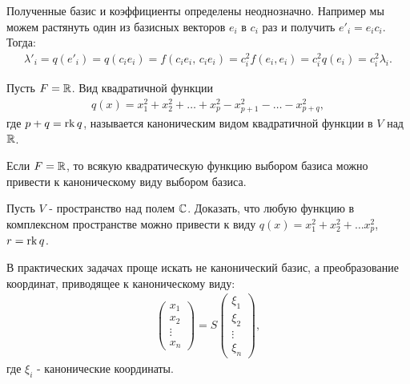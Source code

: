 \begin{note}
    Полученные базис и коэффициенты определены неоднозначно. Например мы можем растянуть один из 
    базисных векторов $e_i$ в $c_i$ раз и получить $e'_i = e_i c_i$. Тогда:
    \begin{gather*}
        \lambda'_i = q(e'_i) = q(c_i e_i) = f(c_i e_i,\, c_i e_i) = c_i^2 f(e_i, e_i) 
        = c_i^2 q(e_i) = c_i^2 \lambda_i.
    \end{gather*}
\end{note}

\begin{definition}
    Пусть $F = \mathbb{R}$. Вид квадратичной функции
    \begin{align*}
        q(x) = x_1^2 + x_2^2 + \dots + x_p^2 - x_{p+1}^2 - \dots - x_{p+q}^2,
    \end{align*} 
    где $p + q = \operatorname{rk} q$, называется каноническим видом квадратичной функции в $V$ над $\mathbb{R}$.
\end{definition}

\begin{corollary}
    Если $F = \mathbb{R}$, то всякую квадратическую функцию выбором базиса можно привести к каноническому виду 
    выбором базиса.
\end{corollary}

\begin{exercise}
    Пусть $V$ - пространство над полем $\mathbb{C}$. Доказать, что любую функцию в комплексном пространстве 
    можно привести к виду $q(x) = x_1^2 + x_2^2 + \dots x_p^2$, $r = \operatorname{rk} q$.
\end{exercise}

\begin{note}
    В практических задачах проще искать не канонический базис, а преобразование координат, приводящее 
    к каноническому виду: 
    \begin{gather*}
        \begin{pmatrix}
            x_1    \\
            x_2    \\
            \vdots \\
            x_n              
        \end{pmatrix} = S \begin{pmatrix}
            \xi_1      \\
            \xi_2      \\
            \vdots          \\
            \xi_n              
            \end{pmatrix},
    \end{gather*}
    где $\xi_i$ - канонические координаты.
\end{note}

